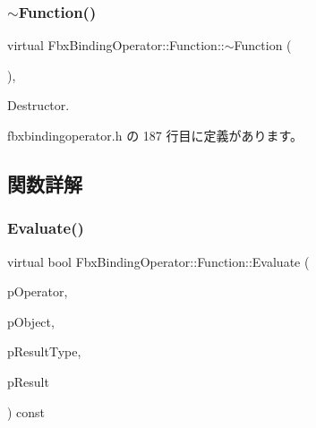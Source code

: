 \subsubsection{\texorpdfstring{$\sim$\+Function()}{~Function()}}
{\footnotesize\ttfamily virtual Fbx\+Binding\+Operator\+::\+Function\+::$\sim$\+Function (\begin{DoxyParamCaption}{ }\end{DoxyParamCaption})\hspace{0.3cm}{\ttfamily [inline]}, {\ttfamily [virtual]}}



Destructor. 



 fbxbindingoperator.\+h の 187 行目に定義があります。



\subsection{関数詳解}
\mbox{\label{class_fbx_binding_operator_1_1_function_aa238a63d12508db3cb5c00a4b157524e}} 
\subsubsection{\texorpdfstring{Evaluate()}{Evaluate()}}
{\footnotesize\ttfamily virtual bool Fbx\+Binding\+Operator\+::\+Function\+::\+Evaluate (\begin{DoxyParamCaption}\item[{const \hyperlink{class_fbx_binding_operator}{Fbx\+Binding\+Operator} $\ast$}]{p\+Operator,  }\item[{const \hyperlink{class_fbx_object}{Fbx\+Object} $\ast$}]{p\+Object,  }\item[{\hyperlink{fbxpropertytypes_8h_a73913a5ddfb20e57c6f25e9e6784bd92}{E\+Fbx\+Type} $\ast$}]{p\+Result\+Type,  }\item[{void $\ast$$\ast$}]{p\+Result }\end{DoxyParamCaption}) const\hspace{0.3cm}{\ttfamily [pure virtual]}}

